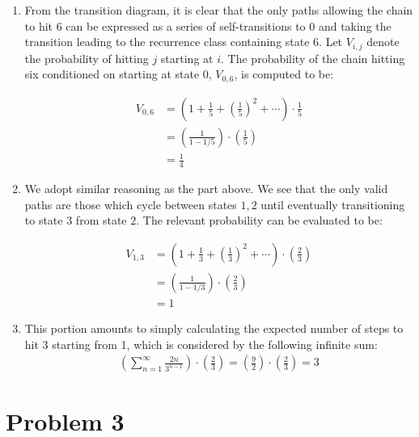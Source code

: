 \documentclass[12pt]{article}%
\begin{document}
\begin{enumerate}
  \item From the transition diagram, it is clear that the only paths allowing the chain to hit 6 can be expressed as a series of self-transitions to 0 and taking the transition leading to the recurrence class containing state 6. Let $V_{i,j}$ denote the probability of hitting $j$ starting at $i$. The probability of the chain hitting six conditioned on starting at state 0, $V_{0,6}$, is computed to be:

        \begin{align*}
          V_{0,6} & = \left(1 + \frac{1}{5} + \left(\frac{1}{5}\right)^{2} + \cdots \right) \cdot \frac{1}{5} \\
          & = \left(\frac{1}{1 - 1/5}\right) \cdot \left(\frac{1}{5}\right) \\
          & = \boxed{\frac{1}{4}}
        \end{align*}

  \item We adopt similar reasoning as the part above. We see that the only valid paths are those which cycle between states $1,2$ until eventually transitioning to state $3$ from state $2$. The relevant probability can be evaluated to be:

        \begin{align*}
          V_{1,3} & = \left(1 + \frac{1}{3} + \left(\frac{1}{3}\right)^{2} + \cdots  \right)  \cdot \left(\frac{2}{3}\right) \\
                  & = \left(\frac{1}{1 - 1/3}\right) \cdot \left(\frac{2}{3}\right) \\
          & = \boxed{1}
        \end{align*}

\item
        This portion amounts to simply calculating the expected number of steps to hit 3 starting from 1, which is considered by the following infinite sum:
        \begin{align*}
          \left(\sum_{n=1}^{\infty} \frac{2n}{3^{n-1}} \right)\cdot \left(\frac{2}{3}\right) = \left(\frac{9}{2}    \right) \cdot \left(\frac{2}{3}\right) = \boxed{3}
        \end{align*}
\end{enumerate}

\section{Problem 3}%
\label{sec:problem-3}
\end{document}
